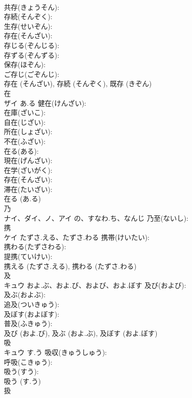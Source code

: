 \documentclass[8pt]{extreport}
\begin{document}
\begin{CJK}{UTF8}{min}
\\	共存(きょうそん): 
\\	存続(そんぞく): 
\\	生存(せいぞん): 
\\	存在(そんざい): 
\\	存じる(ぞんじる): 
\\	存ずる(ぞんずる): 
\\	保存(ほぞん): 
\\	ご存じ(ごぞんじ): 
\\	存在 (そんざい), 存続 (そんぞく), 既存 (きぞん)
\\	在			
\\	ザイ	あ.る	健在(けんざい): 
\\	在庫(ざいこ): 
\\	自在(じざい): 
\\	所在(しょざい): 
\\	不在(ふざい): 
\\	在る(ある): 
\\	現在(げんざい): 
\\	在学(ざいがく): 
\\	存在(そんざい): 
\\	滞在(たいざい): 
\\	在る (あ.る)
\\	乃			
\\	ナイ、ダイ、ノ、アイ	の、すなわ.ち、なんじ	乃至(ないし): 
\\	携			
\\	ケイ	たずさ.える、たずさ.わる	携帯(けいたい): 
\\	携わる(たずさわる): 
\\	提携(ていけい): 
\\	携える (たずさ.える), 携わる (たずさ.わる)
\\	及			
\\	キュウ	およ.ぶ、およ.び、および、およ.ぼす	及び(および): 
\\	及ぶ(およぶ): 
\\	追及(ついきゅう): 
\\	及ぼす(およぼす): 
\\	普及(ふきゅう): 
\\	及び (およ.び), 及ぶ (およ.ぶ), 及ぼす (およ.ぼす)
\\	吸			
\\	キュウ	す.う	吸収(きゅうしゅう): 
\\	呼吸(こきゅう): 
\\	吸う(すう): 
\\	吸う (す.う)
\\	扱			

\end{CJK}
\end{document}

